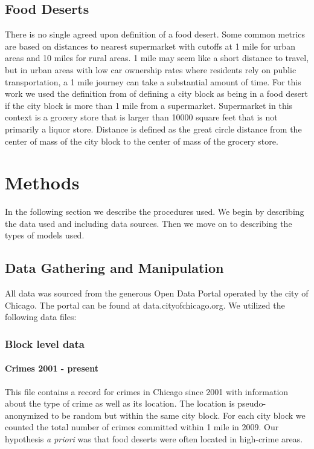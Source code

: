 \documentclass{IEEEtran}
\begin{document}
\subsection{Food Deserts}
There is no single agreed upon definition of a food desert. Some common metrics are based on distances to nearest supermarket with cutoffs at 1 mile for urban areas and 10 miles for rural areas. 1 mile may seem like a short distance to travel, but in urban areas with low car ownership rates where residents rely on public transportation, a 1 mile journey can take a substantial amount of time. 
For this work we used the definition from %
of defining a city block as being in a food desert if the city block is more than 1 mile from a supermarket. Supermarket in this context is a grocery store that is larger than 10000 square feet %
that is not primarily a liquor store. Distance is defined as the great circle distance from the center of mass of the city block to the center of mass of the grocery store. 


\section{Methods}
In the following section we describe the procedures used. We begin by describing the data used and including data sources. Then we move on to describing the types of models used. 

\subsection{Data Gathering and Manipulation}

All data was sourced from the generous Open Data Portal operated by the city of Chicago. The portal can be found at data.cityofchicago.org. We utilized the following data files:

\subsubsection{Block level data}

\paragraph{ Crimes 2001 - present}
This file contains a record for crimes in Chicago since 2001 with information about the type of crime as well as its location. The location is pseudo-anonymized to be random but within the same city block. For each city block we counted the total number of crimes committed within 1 mile in 2009. Our hypothesis \textit{a priori} was that food deserts were often located in high-crime areas. 
\end{document}
